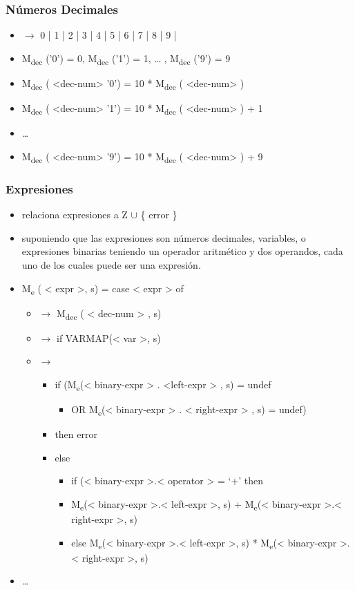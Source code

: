 \documentclass[11pt]{article}
\begin{document}
\subsubsection*{Números Decimales}
\label{sec:orgf40bff1}
\begin{itemize}
\item <dec-num> \(\to\) 0 | 1 | 2 | 3 | 4 | 5 | 6 | 7 | 8 | 9 |
\item M\textsubscript{dec} ('0') = 0,  M\textsubscript{dec} ('1') = 1, \ldots{} , M\textsubscript{dec} ('9') = 9
\item M\textsubscript{dec} ( <dec-num> '0') = 10 * M\textsubscript{dec} ( <dec-num> )
\item M\textsubscript{dec} ( <dec-num> '1') = 10 * M\textsubscript{dec} ( <dec-num> ) + 1
\item \ldots{}
\item M\textsubscript{dec} ( <dec-num> '9') = 10 * M\textsubscript{dec} ( <dec-num> ) + 9
\end{itemize}

\subsubsection*{Expresiones}
\label{sec:org9085d78}
\begin{itemize}
\item relaciona expresiones a Z \(\cup\) \{ error \}
\item suponiendo que las expresiones son números decimales, variables, o
expresiones binarias teniendo un operador aritmético y dos
operandos, cada uno de los cuales puede ser una expresión.
\item M\textsubscript{e} ( < expr >, s) = case < expr > of 
\begin{itemize}
\item < dec-num > \(\to\) M\textsubscript{dec} ( < dec-num > , s)
\item < var > \(\to\) if VARMAP(< var >, s)
\item < binary-expr > \(\to\) 
\begin{itemize}
\item if (M\textsubscript{e}(< binary-expr > . <left-expr > , s) = undef
\begin{itemize}
\item OR M\textsubscript{e}(< binary-expr > . < right-expr > , s) = undef)
\end{itemize}
\item then error
\item else
\begin{itemize}
\item if (< binary-expr >.< operator > = ‘+’ then
\item M\textsubscript{e}(< binary-expr >.< left-expr >, s) + M\textsubscript{e}(< binary-expr >.<
right-expr >, s)
\item else M\textsubscript{e}(< binary-expr >.< left-expr >, s) * M\textsubscript{e}(< binary-expr
>.< right-expr >, s)
\end{itemize}
\end{itemize}
\end{itemize}
\item \ldots{}
\end{itemize}
\end{document}
